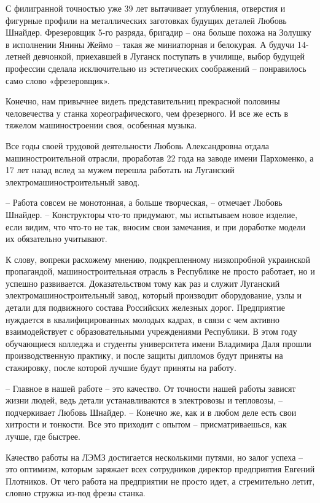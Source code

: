 С филигранной точностью уже 39 лет вытачивает углубления, отверстия и фигурные
профили на металлических заготовках будущих деталей Любовь Шнайдер. Фрезеровщик
5-го разряда, бригадир – она больше похожа на Золушку в исполнении Янины Жеймо
– такая же миниатюрная и белокурая. А будучи 14-летней девчонкой, приехавшей в
Луганск поступать в училище, выбор будущей профессии сделала исключительно из
эстетических соображений – понравилось само слово «фрезеровщик».

Конечно, нам привычнее видеть представительниц прекрасной половины человечества
у станка хореографического, чем фрезерного. И все же есть в тяжелом
машиностроении своя, особенная музыка.

Все годы своей трудовой деятельности Любовь Александровна отдала
машиностроительной отрасли, проработав 22 года на заводе имени Пархоменко, а 17
лет назад вслед за мужем перешла работать на Луганский
электромашиностроительный завод. 

– Работа совсем не монотонная, а больше творческая, – отмечает Любовь Шнайдер.
– Конструкторы что-то придумают, мы испытываем новое изделие, если видим, что
что-то не так, вносим свои замечания, и при доработке модели их обязательно
учитывают.

К слову, вопреки расхожему мнению, подкрепленному низкопробной украинской
пропагандой, машиностроительная отрасль в Республике не просто работает, но и
успешно развивается. Доказательством тому как раз и служит Луганский
электромашиностроительный завод, который производит оборудование, узлы и детали
для подвижного состава Российских железных дорог. Предприятие нуждается в
квалифицированных молодых кадрах, в связи с чем активно взаимодействует с
образовательными учреждениями Республики. В этом году обучающиеся колледжа и
студенты университета имени Владимира Даля прошли производственную практику, и
после защиты дипломов будут приняты на стажировку, после которой лучшие будут
приняты на работу.

– Главное в нашей работе – это качество. От точности нашей работы зависят жизни
людей, ведь детали устанавливаются в электровозы и тепловозы, – подчеркивает
Любовь Шнайдер. – Конечно же, как и в любом деле есть свои хитрости и тонкости.
Все это приходит с опытом – присматриваешься, как лучше, где быстрее.

Качество работы на ЛЭМЗ достигается несколькими путями, но залог успеха – это
оптимизм, которым заряжает всех сотрудников директор предприятия Евгений
Плотников. От чего работа на предприятии не просто идет, а стремительно летит,
словно стружка из-под фрезы станка.

